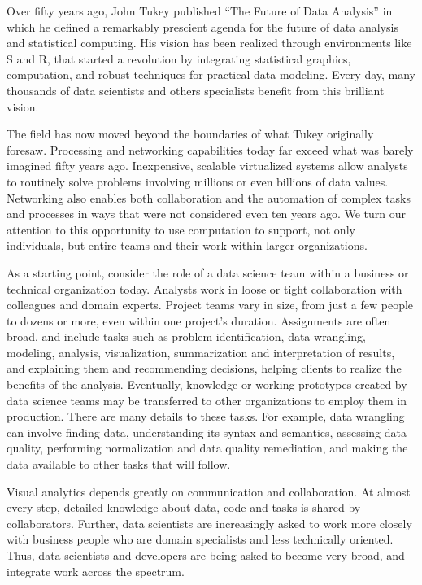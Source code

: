 
\maketitle

Over fifty years ago, John Tukey published ``The Future of Data Analysis''
in which he defined a remarkably prescient agenda for the future of
data analysis and statistical computing. His vision has been realized
through environments like S and R, that started  a revolution by
integrating statistical graphics, computation, and robust techniques
for practical data modeling. Every day, many thousands of data scientists
and others specialists benefit from this brilliant vision.

The field has now moved beyond the boundaries of what Tukey originally
foresaw. Processing and networking capabilities today far exceed
what was barely imagined fifty years ago. Inexpensive, scalable
virtualized systems allow analysts to routinely solve problems
involving millions or even billions of data values. Networking
also enables both collaboration and the automation of complex
tasks and processes in ways that were not considered even ten years ago.
We turn our attention to this opportunity to use computation
to support, not only individuals, but entire teams and their
work within larger organizations.

As a starting point, consider the role of a data science team within
a business or technical organization today.
Analysts work in loose or tight collaboration with colleagues and
domain experts.
Project teams vary in size, from just a few people to dozens or
more, even within one project's duration. Assignments are often
broad, and include tasks such as problem identification,
data wrangling, modeling, analysis, visualization, summarization
and interpretation of results, and explaining them and recommending
decisions, helping clients to realize the benefits of the analysis.
Eventually, knowledge or working prototypes created by data science teams
may be transferred to other organizations to employ them in production.
There are many details to these tasks. For example, data wrangling can involve
finding data, understanding its syntax and semantics, assessing data quality,
performing normalization and data quality remediation, and making the data
available to other tasks that will follow.

Visual analytics depends greatly on communication and collaboration.
At almost every step, detailed knowledge about data, code and tasks
is shared by collaborators. 
Further, data scientists are increasingly asked to work more closely
with business people who are domain specialists and less technically oriented.
Thus, data scientists and developers are being asked to become
very broad, and integrate work across the spectrum.

